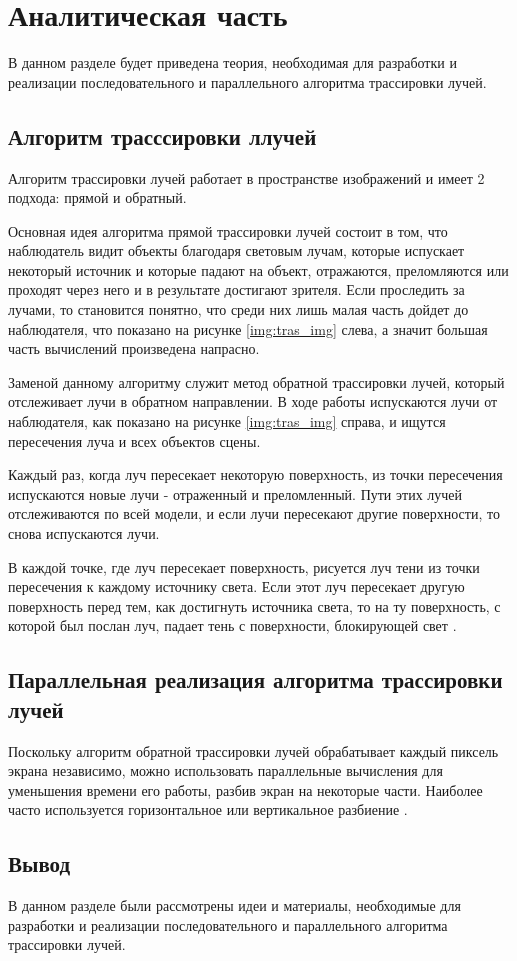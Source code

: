 \chapter{Аналитическая часть}

В данном разделе будет приведена теория, необходимая для разработки и реализации последовательного и параллельного алгоритма трассировки лучей.

\section{Алгоритм трасссировки ллучей}

 Алгоритм трассировки лучей работает в пространстве изображений и имеет 2 подхода: прямой и обратный.
 
 Основная идея алгоритма прямой трассировки лучей состоит в том, что наблюдатель видит объекты благодаря световым лучам, которые испускает некоторый источник и которые падают на объект, отражаются, преломляются или проходят через него и в результате достигают зрителя. Если проследить за лучами, то становится понятно, что среди них лишь малая часть дойдет до наблюдателя, что показано на рисунке \ref{img:tras_img} слева, а значит большая часть вычислений произведена напрасно.
 
 
 

 Заменой данному алгоритму служит метод обратной трассировки лучей, который отслеживает лучи в обратном направлении. В ходе работы испускаются лучи от наблюдателя, как показано на рисунке \ref{img:tras_img} справа, и ищутся пересечения луча и всех объектов сцены.
  
 Каждый раз, когда луч пересекает некоторую поверхность, из точки пересечения испускаются новые лучи - отраженный и преломленный. Пути этих лучей отслеживаются по всей модели, и если лучи пересекают другие поверхности, то снова испускаются лучи. 
 
 В каждой точке, где луч пересекает поверхность, рисуется луч тени из точки пересечения к каждому источнику света. Если этот луч пересекает другую поверхность перед тем, как достигнуть источника света, то на ту поверхность, с которой был послан луч, падает тень с поверхности, блокирующей свет \cite{trass}.
 


\section{Параллельная реализация алгоритма трассировки лучей}

Поскольку алгоритм обратной трассировки лучей обрабатывает каждый пиксель экрана независимо, можно использовать параллельные вычисления для уменьшения времени его работы, разбив экран на некоторые части. Наиболее часто используется горизонтальное или вертикальное разбиение \cite{article_paral}.


\section*{Вывод}
В данном разделе были рассмотрены идеи и материалы, необходимые для разработки и реализации последовательного и параллельного алгоритма трассировки лучей.

